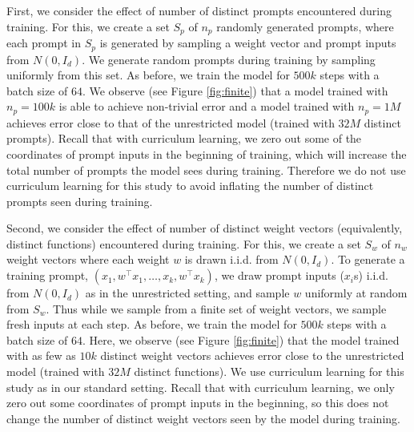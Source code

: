 First, we consider the effect of number of distinct prompts encountered during training. For this, we create a set $S_p$ of $n_p$ randomly generated prompts, where each prompt in $S_p$ is generated by sampling a weight vector and prompt inputs from $N(0, I_d)$. We generate random prompts during training by sampling uniformly from this set. As before, we train the model for $500k$ steps with a batch size of $64$. We observe (see Figure \ref{fig:finite}) that a model trained with $n_p = 100k$ is able to achieve non-trivial error and a model trained with $n_p = 1M$ achieves error close to that of the unrestricted model (trained with $32M$ distinct prompts). Recall that with curriculum learning, we zero out some of the coordinates of prompt inputs in the beginning of training, which will increase the total number of prompts the model sees during training.
Therefore we do not use curriculum learning for this study to avoid inflating the number of distinct prompts seen during training. 



Second, we consider the effect of number of distinct weight vectors  (equivalently, distinct functions) encountered during training. For this, we create a set $S_w$ of $n_w$ weight vectors where each weight $w$ is drawn i.i.d. from $N(0, I_d)$. To generate a training prompt, $(x_1, w^\top x_1, \ldots, x_{k}, w^\top x_{k})$, we draw prompt inputs ($x_i$s) i.i.d. from $N(0, I_d)$ as in the unrestricted setting,  and sample $w$ uniformly at random from $S_w$. Thus while we sample from a finite set of weight vectors, we sample fresh inputs at each step. As before, we train the model for $500k$ steps with a batch size of $64$. Here, we observe (see Figure \ref{fig:finite}) that the model trained with as few as $10k$ distinct weight vectors achieves error close to the unrestricted model (trained with $32M$ distinct functions). We use curriculum learning for this study as in our standard setting. Recall that with curriculum learning, we only zero out some coordinates of prompt inputs in the beginning, so this does not change the number of distinct weight vectors seen by the model during training.

